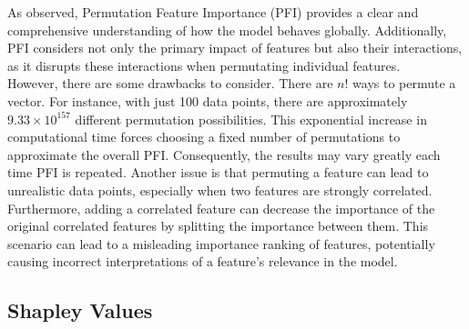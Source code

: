 As observed, Permutation Feature Importance (PFI) provides a clear and comprehensive understanding of how the model behaves globally. Additionally, PFI considers not only the primary impact of features but also their interactions, as it disrupts these interactions when permutating individual features.\\
However, there are some drawbacks to consider. There are $n!$ ways to permute a vector. For instance, with just 100 data points, there are approximately $9.33 \times 10^{157}$ different permutation possibilities. This exponential increase in computational time forces choosing a fixed number of permutations to approximate the overall PFI. Consequently, the results may vary greatly each time PFI is repeated.
Another issue is that permuting a feature can lead to unrealistic data points, especially when two features are strongly correlated. 
Furthermore, adding a correlated feature can decrease the importance of the original correlated features by splitting the importance between them. This scenario can lead to a misleading importance ranking of features, potentially causing incorrect interpretations of a feature's relevance in the model.

\subsection{Shapley Values}

